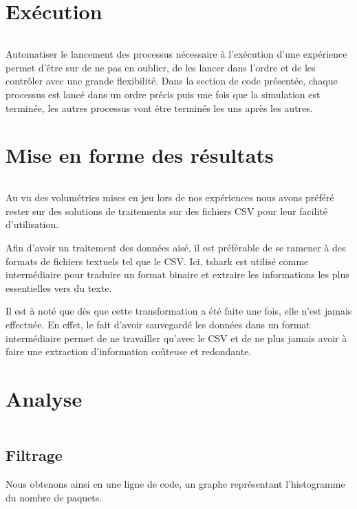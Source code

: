 \section{Exécution}
\label{code:run}

\inputminted{python}{snippets/run.py}

Automatiser le lancement des processus nécessaire à l'exécution d'une expérience permet d'être sur de ne pas en oublier, de les lancer dans l'ordre et de les contrôler avec une grande flexibilité.
Dans la section de code présentée, chaque processus est lancé dans un ordre précis puis une fois que la simulation est terminée, les autres processus vont être terminés les uns après les autres.

\section{Mise en forme des résultats}
\label{code:parsing}

\inputminted{python}{snippets/parsing.py}

Au vu des volumétries mises en jeu lors de nos expériences nous avons préféré rester sur des solutions de traitements sur des fichiers \ac{CSV} pour leur facilité d'utilisation.

Afin d'avoir un traitement des données aisé, il est préférable de se ramener à des formats de fichiers textuels tel que le CSV. 
Ici, tshark est utilisé comme intermédiaire pour traduire un format binaire et extraire les informations les plus essentielles vers du texte.

Il est à noté que dès que cette transformation a été faite une fois, elle n'est jamais effectuée. 
En effet, le fait d'avoir sauvegardé les données dans un format intermédiaire permet de ne travailler qu'avec le CSV et de ne plus jamais avoir à faire une extraction d'information coûteuse et redondante. 

\section{Analyse} %
\label{code:analyse}

\inputminted{python}{snippets/pandas.py}

\subsection{Filtrage}

Nous obtenons ainsi en une ligne de code, un graphe représentant l'histogramme du nombre de paquets.


